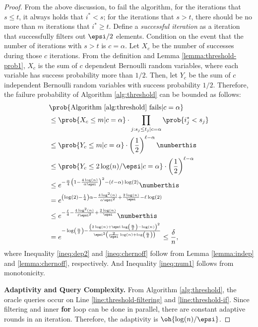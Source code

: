\begin{proof}
From the above discussion, to fail the algorithm, for the iterations that $s\le t$,
it always holds that $i^* < s$; for the iterations that $s >t$, 
there should be no more than $m$ iterations that $i^* \ge t$.
Define a \textit{successful iteration} as a iteration that successfully filters out $\epsi/2$ elements.
Condition on the event that the number of iterations with $s > t$ is $c=\alpha$.
Let $X_c$ be the number of successes during those $c$ iterations.
From the definition and Lemma \ref{lemma:threshold-prob1}, $X_c$ is the sum of $c$ dependent Bernoulli random variables,
where each variable has success probability more than $1/2$.
Then, let $Y_c$ be the sum of $c$ independent Bernoulli random variables
with success probability $1/2$.
Therefore, the failure probability of Algorithm \ref{alg:threshold} can be bounded as follows:
\begin{align*}
	&\prob{\text{Algorithm \ref{alg:threshold} fails}|c=\alpha} \\
	&\le \prob{X_c \le m|c=\alpha} \cdot \prod_{j:s_j \le t_j|c=\alpha}\prob{i_j^* < s_j}\\
	&\le \prob{Y_c \le m|c=\alpha} \cdot \left(\frac{1}{2}\right)^{\ell-\alpha} \numberthis \label{ineq:dep2}\\ 
	&\le \prob{Y_c \le 2\log(n)/\epsi|c=\alpha}\cdot \left(\frac{1}{2}\right)^{\ell-\alpha}\\ 
	&\le e^{-\frac{\alpha}{4}\left(1-\frac{4\log(n)}{\alpha\epsi}\right)^2 -(\ell-\alpha)\log(2)} \numberthis \label{ineq:chernoff}\\ 
	&= e^{\left(\log(2)-\frac{1}{4}\right)\alpha-\frac{4\log^2(n)}{\alpha \epsi^2}+\frac{2\log(n)}{\epsi}-\ell \log(2)}\\
	&\le e^{-\frac{\ell}{4}-\frac{4\log^2(n)}{\ell \epsi^2}+ \frac{2\log(n)}{\epsi}}  \numberthis \label{ineq:num1}\\
	&= e^{-\log\left(\frac{n}{\delta}\right)-\frac{\left(2\log(n) + \epsi\log\left(\frac{n}{\delta}\right)-\log(n)\right)^2}{\epsi^2\left(\frac{2}{\epsi}\log(n)+\log\left(\frac{n}{\delta}\right)\right)}} \le \frac{\delta}{n},
\end{align*}
where Inequality \ref{ineq:dep2} and \ref{ineq:chernoff} follow from 
Lemma \ref{lemma:indep} and \ref{lemma:chernoff}, respectively.
And Inequality \ref{ineq:num1} follows from monotonicity.

\textbf{Adaptivity and Query Complexity.}
From Algorithm \ref{alg:threshold}, the oracle queries occur on Line 
\ref{line:threshold-filtering} and \ref{line:threshold-if}.
Since filtering and inner \textbf{for} loop can be done in parallel, there are constant adaptive rounds in an iteration.
Therefore, the adaptivity is $\oh{\log(n)/\epsi}$.


\end{proof}
